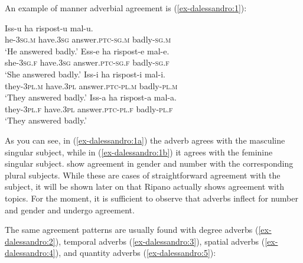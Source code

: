 \documentclass[output=paper
,modfonts
,nonflat]{langsci/langscibook}
\begin{document}
An example of manner adverbial agreement is (\ref{ex-dalessandro:1}):

\begin{exe}
\ex\label{ex-dalessandro:1} \citet[8]{Burroni_Et_Al2016} \xlist
	\ex \label{ex-dalessandro:1a}
	\gll Iss-u    ha    rispost-u     mal-u.\\
	he-3\textsc{sg.m}  have.\textsc{3sg}  answer.\textsc{ptc-sg.m}  badly-\textsc{sg.m}\\
	\glt `He answered badly.' 
	\ex\label{ex-dalessandro:1b}
	\gll Ess-e    ha    rispost-e     mal-e.\\
	she-\textsc{3sg.f}  have.\textsc{3sg}  answer\textsc{.ptc-sg.f}  badly-\textsc{sg.f}\\
	\glt `She answered badly.' 
	\ex\label{ex-dalessandro:1c}
	\gll Iss-i    ha     rispost-i    mal-i.\\
	they-\textsc{3pl.m} have.\textsc{3pl} answer.\textsc{ptc-pl.m}  badly-\textsc{pl.m}\\
	\glt `They answered badly.' 
	\ex\label{ex-dalessandro:1d}
	\gll Iss-a    ha    rispost-a    mal-a.\\
	they-\textsc{3pl.f} have.\textsc{3pl} answer.\textsc{ptc-pl.f}  badly-\textsc{pl.f}\\
	\glt `They answered badly.' 
\endxlist
\end{exe}
As you can see, in (\ref{ex-dalessandro:1a}) the adverb agrees with the masculine singular subject, while in (\ref{ex-dalessandro:1b}) it agrees with the feminine singular subject.  show agreement in gender and number with the corresponding plural subjects. While these are cases of straightforward agreement with the subject, it will be shown later on that Ripano actually shows agreement with topics. For the moment, it is sufficient to observe that adverbs inflect for number and gender and undergo agreement.

The same agreement patterns are usually found with degree adverbs (\ref{ex-dalessandro:2}), temporal adverbs (\ref{ex-dalessandro:3}), spatial adverbs (\ref{ex-dalessandro:4}), and quantity adverbs (\ref{ex-dalessandro:5}):

\begin{exe}
	\ex \label{ex-dalessandro:2} \citet{Ledgeway2012} 
	\endxlist
\end{exe}
\end{document}
